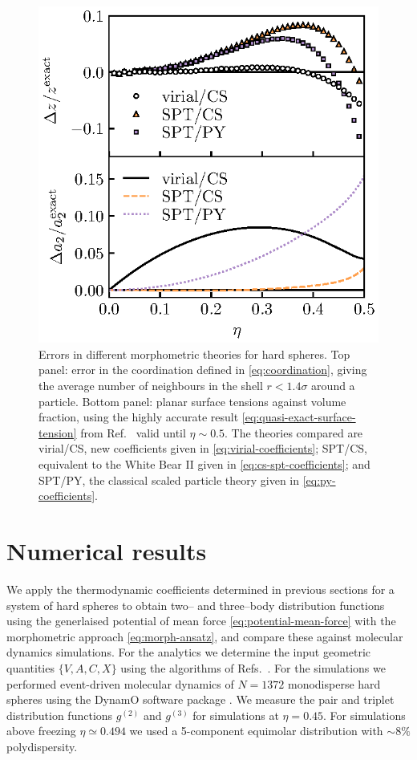\documentclass[11pt,twoside]{report}
\begin{document}
\begin{figure}
  \includegraphics[width=0.9\linewidth,outer]{a2-errors}
  \caption{Errors in different morphometric theories for hard spheres.
    Top panel: error in the coordination defined in \eqref{eq:coordination}, giving the average number of neighbours in the shell $r < 1.4\sigma$ around a particle.
    Bottom panel: planar surface tensions against volume fraction, using the highly accurate result \eqref{eq:quasi-exact-surface-tension} from Ref.\ \cite{DavidchackMP2015} valid until $\eta \sim 0.5$.
  The theories compared are virial/CS, new coefficients given in \eqref{eq:virial-coefficients}; SPT/CS, equivalent to the White Bear II \cite{Hansen-GoosJPCM2006} given in \eqref{eq:cs-spt-coefficients}; and SPT/PY, the classical scaled particle theory \cite{ReissJCP1959} given in \eqref{eq:py-coefficients}.}
  \label{fig:surface-tension}
\end{figure}

\section{Numerical results}
\label{sec:numerics}

We apply the thermodynamic coefficients determined in previous sections for a system of hard spheres to obtain two-- and three--body distribution functions using the generlaised potential of mean force \eqref{eq:potential-mean-force} with the morphometric approach \eqref{eq:morph-ansatz}, and compare these against molecular dynamics simulations.
For the analytics we determine the input geometric quantities $\{V,A,C,X\}$ using the algorithms of Refs.\ \cite{MeckeAA1994,KleninJCC2011}.
For the simulations we performed event-driven molecular dynamics of $N=1372$ monodisperse hard spheres using the DynamO software package \cite{BannermanJCP2010}.
We measure the pair and triplet distribution functions $g^{(2)}$ and $g^{(3)}$ for simulations at $\eta = 0.45$.
For simulations above freezing $\eta \simeq 0.494$ we used a 5-component equimolar distribution with $\sim8\%$ polydispersity.
\end{document}
